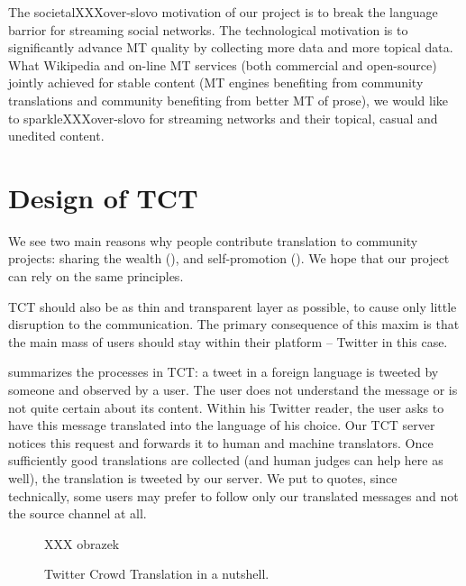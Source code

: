 The societalXXXover-slovo motivation of our project is to break the language
barrior for streaming social networks. The technological motivation is to
significantly advance MT quality by collecting more data and more topical data.
What Wikipedia and on-line MT services (both commercial and open-source) jointly
achieved for stable content (MT engines benefiting from community translations
and community benefiting from better MT of prose),
we would like to sparkleXXXover-slovo for streaming networks and their topical,
casual and unedited content.

\section{Design of TCT}
\label{design}

We see two main reasons why people
contribute translation to community projects: sharing the wealth (), and self-promotion
().
We hope that our project can rely on the same principles.

TCT should also be as thin and transparent layer as possible, to cause only
little disruption to the communication. The primary consequence of this maxim is
that the main mass of users should stay within their platform -- Twitter in this
case.

 summarizes the processes in TCT: a tweet in a foreign language is
tweeted by someone and observed by a user. The user does not understand the
message or is not quite certain about its content. Within his Twitter reader,
the user asks  to have this message translated
into the language of his choice. Our TCT server notices this request and
forwards it to human and machine translators. Once sufficiently good
translations are collected (and human judges can help here as well), the
translation is tweeted  by our server. We put  to quotes,
since technically, some users may prefer to follow only our translated messages
and not the source channel at all.

\begin{figure}[t]
\begin{center}
XXX obrazek
\end{center}
\caption{Twitter Crowd Translation in a nutshell.}
\label{schema}
\end{figure}


